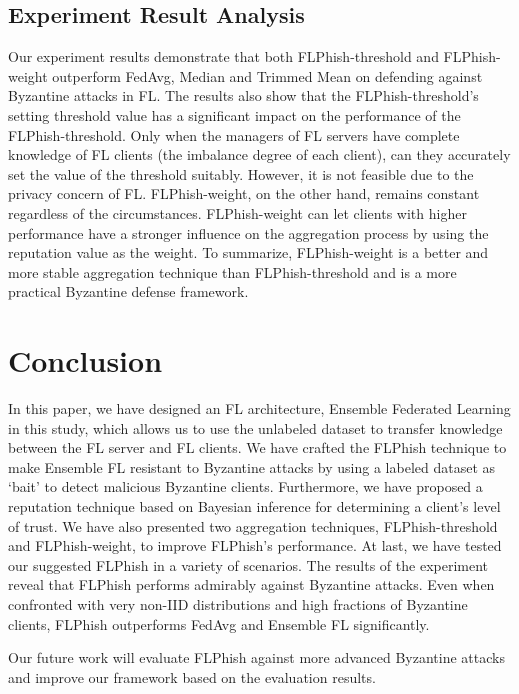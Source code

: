 \documentclass[journal]{IEEEtran}
\begin{document}
    \subsection{{Experiment Result Analysis}} Our experiment results demonstrate that both FLPhish-threshold and FLPhish-weight outperform FedAvg, Median \cite{ref_13_defense} and Trimmed Mean \cite{ref_13_defense} on defending against Byzantine attacks in FL. The results also show that the FLPhish-threshold's setting threshold value has a significant impact on the performance of the FLPhish-threshold. Only when the managers of FL servers have complete knowledge of FL clients (the imbalance degree of each client), can they accurately set the value of the threshold suitably. However, it is not feasible due to the privacy concern of FL. FLPhish-weight, on the other hand, remains constant regardless of the circumstances. FLPhish-weight can let clients with higher performance have a stronger influence on the aggregation process by using the reputation value as the weight. To summarize, FLPhish-weight is a better and more stable aggregation technique than FLPhish-threshold and is a more practical Byzantine defense framework.






\section{Conclusion}

In this paper, we have designed an FL architecture, Ensemble Federated Learning in this study, which allows us to use the unlabeled dataset to transfer knowledge between the FL server and FL clients. We have crafted the FLPhish technique to make Ensemble FL resistant to Byzantine attacks by using a labeled dataset as `bait' to detect malicious Byzantine clients. Furthermore, we have proposed a reputation technique based on Bayesian inference for determining a client's level of trust. We have also presented two aggregation techniques, FLPhish-threshold and FLPhish-weight, to improve FLPhish's performance. At last, we have tested our suggested FLPhish in a variety of scenarios. The results of the experiment reveal that FLPhish performs admirably against Byzantine attacks. Even when confronted with very non-IID distributions and high fractions of Byzantine clients, FLPhish outperforms FedAvg and Ensemble FL significantly.
\par Our future work will evaluate FLPhish against more advanced Byzantine attacks and improve our framework based on the evaluation results.









\end{document}
